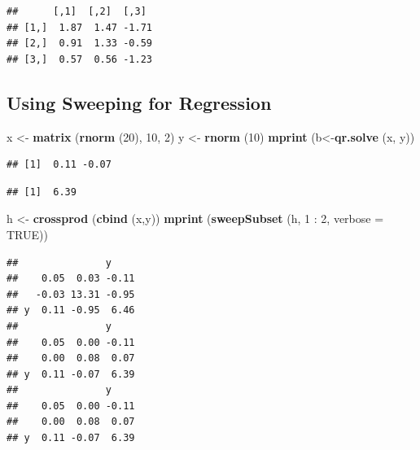 \documentclass[]{article}
\newenvironment{Shaded}{\begin{snugshade}}{\end{snugshade}}
\newcommand{\KeywordTok}[1]{\textcolor[rgb]{0.13,0.29,0.53}{\textbf{{#1}}}}
\newcommand{\DataTypeTok}[1]{\textcolor[rgb]{0.13,0.29,0.53}{{#1}}}
\newcommand{\DecValTok}[1]{\textcolor[rgb]{0.00,0.00,0.81}{{#1}}}
\newcommand{\StringTok}[1]{\textcolor[rgb]{0.31,0.60,0.02}{{#1}}}
\newcommand{\OtherTok}[1]{\textcolor[rgb]{0.56,0.35,0.01}{{#1}}}
\newcommand{\NormalTok}[1]{{#1}}
\begin{document}
\begin{verbatim}
##      [,1]  [,2]  [,3] 
## [1,]  1.87  1.47 -1.71
## [2,]  0.91  1.33 -0.59
## [3,]  0.57  0.56 -1.23
\end{verbatim}

\subsection{Using Sweeping for
Regression}\label{using-sweeping-for-regression}

\begin{Shaded}
\begin{Highlighting}[]
\NormalTok{x <-}\StringTok{ }\KeywordTok{matrix} \NormalTok{(}\KeywordTok{rnorm} \NormalTok{(}\DecValTok{20}\NormalTok{), }\DecValTok{10}\NormalTok{, }\DecValTok{2}\NormalTok{)}
\NormalTok{y <-}\StringTok{ }\KeywordTok{rnorm} \NormalTok{(}\DecValTok{10}\NormalTok{)}
\KeywordTok{mprint} \NormalTok{(b<-}\KeywordTok{qr.solve} \NormalTok{(x, y))}
\end{Highlighting}
\end{Shaded}

\begin{verbatim}
## [1]  0.11 -0.07
\end{verbatim}

\begin{Shaded}
\end{Shaded}

\begin{verbatim}
## [1]  6.39
\end{verbatim}

\begin{Shaded}
\begin{Highlighting}[]
\NormalTok{h <-}\StringTok{ }\KeywordTok{crossprod} \NormalTok{(}\KeywordTok{cbind} \NormalTok{(x,y))}
\KeywordTok{mprint} \NormalTok{(}\KeywordTok{sweepSubset} \NormalTok{(h, }\DecValTok{1} \NormalTok{:}\StringTok{ }\DecValTok{2}\NormalTok{, }\DataTypeTok{verbose =} \OtherTok{TRUE}\NormalTok{))}
\end{Highlighting}
\end{Shaded}

\begin{verbatim}
##               y    
##    0.05  0.03 -0.11
##   -0.03 13.31 -0.95
## y  0.11 -0.95  6.46
##               y    
##    0.05  0.00 -0.11
##    0.00  0.08  0.07
## y  0.11 -0.07  6.39
##               y    
##    0.05  0.00 -0.11
##    0.00  0.08  0.07
## y  0.11 -0.07  6.39
\end{verbatim}
\end{document}
